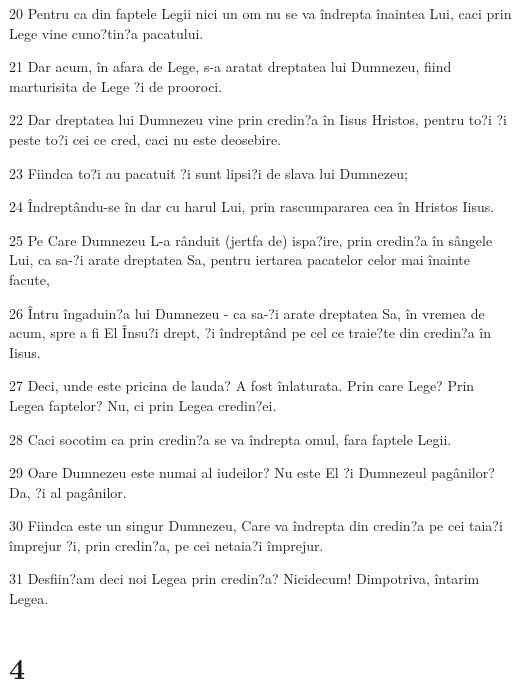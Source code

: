 \par 20 Pentru ca din faptele Legii nici un om nu se va îndrepta înaintea Lui, caci prin Lege vine cuno?tin?a pacatului.
\par 21 Dar acum, în afara de Lege, s-a aratat dreptatea lui Dumnezeu, fiind marturisita de Lege ?i de prooroci.
\par 22 Dar dreptatea lui Dumnezeu vine prin credin?a în Iisus Hristos, pentru to?i ?i peste to?i cei ce cred, caci nu este deosebire.
\par 23 Fiindca to?i au pacatuit ?i sunt lipsi?i de slava lui Dumnezeu;
\par 24 Îndreptându-se în dar cu harul Lui, prin rascumpararea cea în Hristos Iisus.
\par 25 Pe Care Dumnezeu L-a rânduit (jertfa de) ispa?ire, prin credin?a în sângele Lui, ca sa-?i arate dreptatea Sa, pentru iertarea pacatelor celor mai înainte facute,
\par 26 Întru îngaduin?a lui Dumnezeu - ca sa-?i arate dreptatea Sa, în vremea de acum, spre a fi El Însu?i drept, ?i îndreptând pe cel ce traie?te din credin?a în Iisus.
\par 27 Deci, unde este pricina de lauda? A fost înlaturata. Prin care Lege? Prin Legea faptelor? Nu, ci prin Legea credin?ei.
\par 28 Caci socotim ca prin credin?a se va îndrepta omul, fara faptele Legii.
\par 29 Oare Dumnezeu este numai al iudeilor? Nu este El ?i Dumnezeul pagânilor? Da, ?i al pagânilor.
\par 30 Fiindca este un singur Dumnezeu, Care va îndrepta din credin?a pe cei taia?i împrejur ?i, prin credin?a, pe cei netaia?i împrejur.
\par 31 Desfiin?am deci noi Legea prin credin?a? Nicidecum! Dimpotriva, întarim Legea.

\chapter{4}

